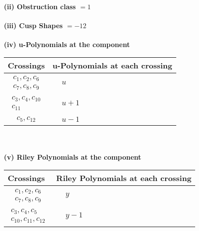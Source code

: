\documentclass[1p]{elsarticle_modified}
\theoremstyle{definition}
\begin{document}
\flushleft \textbf{(ii) Obstruction class $= 1$}\\~\\
\flushleft \textbf{(iii) Cusp Shapes $= -12$}\\~\\
\newpage\renewcommand{\arraystretch}{1}
\flushleft \textbf{(iv) u-Polynomials at the component}\newline \\
\begin{tabular}{m{50pt}|m{274pt}}
Crossings & \hspace{64pt}u-Polynomials at each crossing \\
\hline $$\begin{aligned}c_{1},c_{2},c_{6}\\c_{7},c_{8},c_{9}\end{aligned}$$&$\begin{aligned}
&u
\end{aligned}$\\
\hline $$\begin{aligned}c_{3},c_{4},c_{10}\\c_{11}\end{aligned}$$&$\begin{aligned}
&u+1
\end{aligned}$\\
\hline $$\begin{aligned}c_{5},c_{12}\end{aligned}$$&$\begin{aligned}
&u-1
\end{aligned}$\\
\hline
\end{tabular}\\~\\
\newpage\renewcommand{\arraystretch}{1}
\flushleft \textbf{(v) Riley Polynomials at the component}\newline \\
\begin{tabular}{m{50pt}|m{274pt}}
Crossings & \hspace{64pt}Riley Polynomials at each crossing \\
\hline $$\begin{aligned}c_{1},c_{2},c_{6}\\c_{7},c_{8},c_{9}\end{aligned}$$&$\begin{aligned}
&y
\end{aligned}$\\
\hline $$\begin{aligned}c_{3},c_{4},c_{5}\\c_{10},c_{11},c_{12}\end{aligned}$$&$\begin{aligned}
&y-1
\end{aligned}$\\
\hline
\end{tabular}\\~\\
\end{document}
